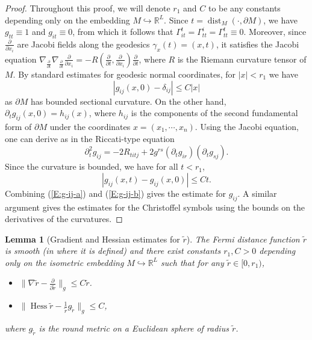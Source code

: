 \documentclass[10pt]{amsart}
\newtheorem{lemma}[theorem]{Lemma}
\theoremstyle{definition}
\theoremstyle{remark}
\numberwithin{equation}{section}
\newcommand{\de}{\delta}
\newcommand{\tir}{\widetilde{r}}
\newcommand{\dist}{\operatorname{dist}}
\newcommand{\Hess}{\operatorname{Hess}}
\begin{document}
\begin{proof}
Throughout this proof, we will denote $r_1$ and $C$ to be any constants depending only on the embedding $M \hookrightarrow \mathbb{R}^L$. Since $t=\dist_M(\cdot,\partial M)$, we have $g_{tt} \equiv 1$ and $g_{it} \equiv 0$, from which it follows that $\Gamma_{it}^t=\Gamma_{tt}^i=\Gamma_{tt}^t \equiv 0$. Moreover, since $\frac{\partial}{\partial x_i}$ are Jacobi fields along the geodesics $\gamma_x(t)=(x,t)$, it satisfies the Jacobi equation $\nabla_{\frac{\partial}{\partial t}} \nabla_{\frac{\partial}{\partial t}} \frac{\partial}{\partial x_i} = -R\left(\frac{\partial}{\partial t},\frac{\partial}{\partial x_i}\right) \frac{\partial}{\partial t}$, where $R$ is the Riemann curvature tensor of $M$. By standard estimates for geodesic normal coordinates, for $|x|<r_1$ we have
\begin{equation}
\label{E:g-ij-a}
|g_{ij}(x,0)-\de_{ij}| \leq C |x| 
\end{equation}
as $\partial M$ has bounded sectional curvature. On the other hand, $\partial_t g_{ij}(x,0)=h_{ij}(x)$, where $h_{ij}$ is the components of the second fundamental form of $\partial M$ under the coordinates $x=(x_1,\cdots,x_n)$. Using the Jacobi equation, one can derive as in \cite[Lemma 2.2]{Marques05} the Riccati-type equation
\[ \partial_t^2 g_{ij}=-2 R_{titj} +2g^{rs} (\partial_t g_{ir}) (\partial_t g_{sj}).\]
Since the curvature is bounded, we have for all $t < r_1$,
\begin{equation}
\label{E:g-ij-b}
|g_{ij}(x,t) - g_{ij}(x,0)| \leq C t.
\end{equation}
Combining (\ref{E:g-ij-a}) and (\ref{E:g-ij-b}) gives the estimate for $g_{ij}$. A similar argument gives the estimates for the Christoffel symbols using the bounds on the derivatives of the curvatures.
\end{proof}


\begin{lemma}[Gradient and Hessian estimates for $\tir$]
\label{L:r-tilde}
The Fermi distance function $\tir$ is smooth (in where it is defined) and there exist constants $r_1,C>0$ depending only on the isometric embedding $M \hookrightarrow \mathbb{R}^L$ such that for any $\tir \in [0,r_1)$,
\begin{itemize}
\item[(i)] $\|\nabla \tir - \frac{\partial}{\partial \tir}\|_g \leq C \tir$. 
\item[(ii)] $\| \Hess \tir - \frac{1}{\tir} g_{\tir} \|_g \leq C$,
\end{itemize}
where $g_{\tir}$ is the round metric on a Euclidean sphere of radius $\tir$.
\end{lemma}
\end{document}
